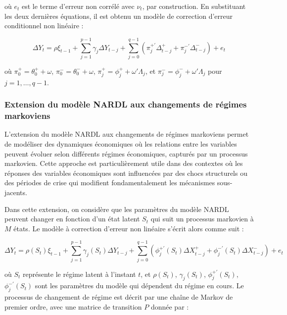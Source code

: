 où \(e_t\) est le terme d'erreur non corrélé avec \( \nu_t \), par construction. En substituant les deux dernières équations, il est obtenu un modèle de correction d'erreur conditionnel non linéaire :

\begin{equation}
   \Delta Y_t = \rho \xi_{t-1} + \sum_{j=1}^{p-1} \gamma_j \Delta Y_{t-j} + \sum_{j=0}^{q-1} \left ( \pi_j^{+'} \Delta_{t-j}^+ + \pi_j^{-'} \Delta_{t-j}^- \right ) + e_t 
\end{equation}

où \( \pi_0^{+} = \theta_{0}^+ + \omega \), \( \pi^{-}_0 = \theta_0^{-} + \omega \), \( \pi_{j}^+ = \phi_{j}^+ + \omega '  \Lambda_j \), et \( \pi_{j}^- = \phi_{j}^- + \omega ' \Lambda_j \) pour \( j = 1, \ldots, q-1 \).\\

\subsubsection{Extension du modèle NARDL aux changements de régimes markoviens}

L'extension du modèle NARDL aux changements de régimes markoviens permet de modéliser des dynamiques économiques où les relations entre les variables peuvent évoluer selon différents régimes économiques, capturés par un processus markovien. Cette approche est particulièrement utile dans des contextes où les réponses des variables économiques sont influencées par des chocs structurels ou des périodes de crise qui modifient fondamentalement les mécanismes sous-jacents.

Dans cette extension, on considère que les paramètres du modèle NARDL peuvent changer en fonction d'un état latent \( S_t \) qui suit un processus markovien à \( M \) états. Le modèle à correction d'erreur non linéaire s'écrit alors comme suit :

\begin{equation}
   \Delta Y_t = \rho(S_t) \xi_{t-1} + \sum_{j=1}^{p-1} \gamma_j(S_t) \Delta Y_{t-j} + \sum_{j=0}^{q-1} \left( \phi_j^{+'}(S_t) \Delta X_{t-j}^+ + \phi_j^{-'}(S_t) \Delta X_{t-j}^- \right) + e_t 
\end{equation}

où \( S_t \) représente le régime latent à l'instant \( t \), et \( \rho(S_t) \), \( \gamma_j(S_t) \), \( \phi_j^{+'}(S_t) \), \( \phi_j^{-'}(S_t) \) sont les paramètres du modèle qui dépendent du régime en cours. Le processus de changement de régime est décrit par une chaîne de Markov de premier ordre, avec une matrice de transition \( P \) donnée par :

